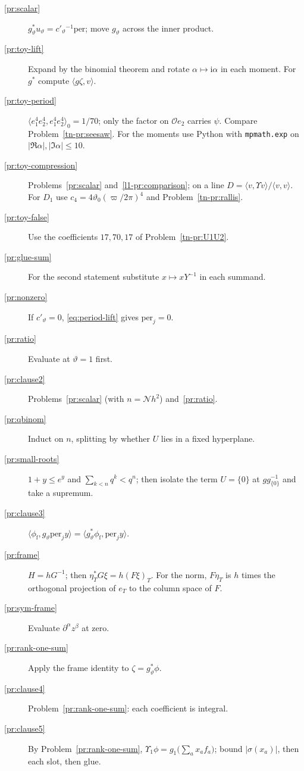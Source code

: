 \documentclass[reqno]{amsart}
\theoremstyle{definition}
\theoremstyle{plain}
\theoremstyle{remark}
\newcommand{\Oc}{{\mathcal{O}}}
\newcommand{\Nc}{{\mathcal{N}}}
\newcommand{\ii}{\mathrm{i}}
\newcommand{\per}{\mathrm{per}}
\newcommand{\phif}{\phi_{\mathrm f}}
\newcommand{\vt}{\vartheta}
\begin{document}
\begin{description}
\item[\ref{pr:scalar}] \(g_\vt^*u_\vt = c'_\vt{}^{-1}\per\); move \(g_\vt\) across the inner product.
\item[\ref{pr:toy-lift}] Expand by the binomial theorem and rotate \(\alpha\mapsto\ii\alpha\) in each moment.  For \(g^*\) compute \(\langle g\zeta,v\rangle\).
\item[\ref{pr:toy-period}] \(\langle e_1^4e_2^4,e_1^4e_2^4\rangle_0 = 1/70\); only the factor on \(\Oc e_2\) carries \(\psi\).  Compare Problem~\ref{tn-pr:seesaw}.  For the moments use Python with \texttt{mpmath.exp} on \(|\Re\alpha|,|\Im\alpha|\le10\).
\item[\ref{pr:toy-compression}] Problems~\ref{pr:scalar} and~\ref{l1-pr:comparison}; on a line \(D = \langle v,\Upsilon v\rangle/\langle v,v\rangle\).  For \(D_1\) use \(c_4 = 4\vt_0(\varpi/2\pi)^4\) and Problem~\ref{tn-pr:rallis}.
\item[\ref{pr:toy-false}] Use the coefficients \(17, 70, 17\) of Problem~\ref{tn-pr:U1U2}.
\item[\ref{pr:glue-sum}] For the second statement substitute \(x\mapsto xY^{-1}\) in each summand.
\item[\ref{pr:nonzero}] If \(c'_\vt = 0\), \eqref{eq:period-lift} gives \(\per_j = 0\).
\item[\ref{pr:ratio}] Evaluate at \(\vt = 1\) first.
\item[\ref{pr:clause2}] Problems~\ref{pr:scalar} (with \(n = \Nc h^2\)) and~\ref{pr:ratio}.
\item[\ref{pr:qbinom}] Induct on \(n\), splitting by whether \(U\) lies in a fixed hyperplane.
\item[\ref{pr:small-roots}] \(1+y\le e^y\) and \(\sum_{k<n}q^k < q^n\); then isolate the term \(U = \{0\}\) at \(g g_{\{0\}}^{-1}\) and take a supremum.
\item[\ref{pr:clause3}] \(\langle\phif, g_\vt\per_jy\rangle = \langle g_\vt^*\phif, \per_jy\rangle\).
\item[\ref{pr:frame}] \(H = hG^{-1}\); then \(\eta_T^*G\xi = h(F\xi)_T\).  For the norm, \(F\eta_T\) is \(h\) times the orthogonal projection of \(e_T\) to the column space of \(F\).
\item[\ref{pr:sym-frame}] Evaluate \(\partial^\alpha z^\beta\) at zero.
\item[\ref{pr:rank-one-sum}] Apply the frame identity to \(\zeta = g_\vt^*\phi\).
\item[\ref{pr:clause4}] Problem~\ref{pr:rank-one-sum}: each coefficient is integral.
\item[\ref{pr:clause5}] By Problem~\ref{pr:rank-one-sum}, \(\Upsilon_1\phi = g_1\bigl(\sum_a x_af_a\bigr)\); bound \(\lvert\sigma(x_a)\rvert\), then each slot, then glue.
\end{description}
\end{document}

